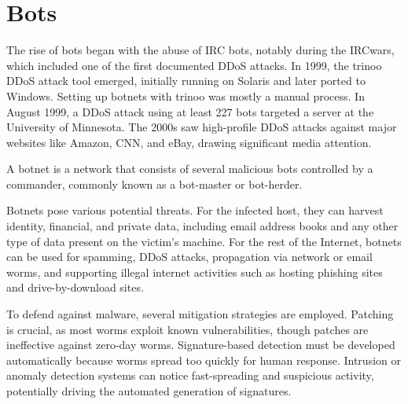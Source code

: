 \section{Bots}

The rise of bots began with the abuse of IRC bots, notably during the IRCwars, which included one of the first documented DDoS attacks. 
In 1999, the trinoo DDoS attack tool emerged, initially running on Solaris and later ported to Windows.
Setting up botnets with trinoo was mostly a manual process. 
In August 1999, a DDoS attack using at least 227 bots targeted a server at the University of Minnesota. 
The 2000s saw high-profile DDoS attacks against major websites like Amazon, CNN, and eBay, drawing significant media attention.

\begin{definition}
    A botnet is a network that consists of several malicious bots controlled by a commander, commonly known as a bot-master or bot-herder.
\end{definition}

Botnets pose various potential threats. 
For the infected host, they can harvest identity, financial, and private data, including email address books and any other type of data present on the victim's machine. 
For the rest of the Internet, botnets can be used for spamming, DDoS attacks, propagation via network or email worms, and supporting illegal internet activities such as hosting phishing sites and drive-by-download sites.

To defend against malware, several mitigation strategies are employed. 
Patching is crucial, as most worms exploit known vulnerabilities, though patches are ineffective against zero-day worms. 
Signature-based detection must be developed automatically because worms spread too quickly for human response.
Intrusion or anomaly detection systems can notice fast-spreading and suspicious activity, potentially driving the automated generation of signatures.